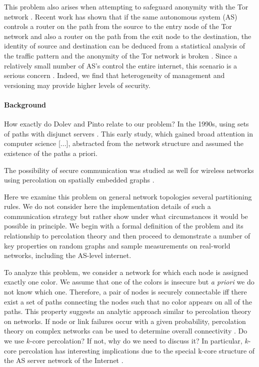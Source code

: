 \documentclass[aps, pre, twocolumn, a4paper, floatfix]{revtex4}
\begin{document}
This problem also arises when attempting to safeguard anonymity with the Tor network \cite{dingledine-proceedings2004}.  
Recent work has shown that if the same autonomous system (AS) controls a router on the path from the source to the entry node of the Tor network and also a router on the path from the exit node to the destination, the identity of source and destination can be deduced from a statistical analysis of the traffic pattern and the anonymity of the Tor network is broken \cite{murdoch-proceedings2007}.
Since a relatively small number of AS's control the entire internet, this scenario is a serious concern \cite{edman-proceedings2009}.
Indeed, we find that heterogeneity of management and versioning may provide higher levels of security.


\paragraph{Background}

{ \color{red} How exactly do Dolev and Pinto relate to our problem? }
In the 1990s, using sets of paths with disjunct servers \cite{dolev-acm1993}.
This early study, which gained broad attention in computer science [...],
abstracted from the network structure and assumed the existence of the paths a priori. 

The possibility of secure communication was studied as
well for wireless networks using percolation on spatially embedded
graphs \cite{pinto-ieee2012}. 


Here we examine this problem on general network topologies several partitioning rules.  
We do not consider here the implementation details of such a communication strategy but rather show under what circumstances it would be possible in principle.
We begin with a formal definition of the problem and its relationship to percolation theory and then proceed to demonstrate a number of key properties on random graphs and sample measurements on real-world networks, including the AS-level internet.

To analyze this problem, we consider a network for which each node is assigned exactly one color.
We assume that one of the colors is insecure but \textit{a priori} we do not know  which one.
Therefore, a pair of nodes is securely connectable iff there exist a set of paths connecting the nodes such that no color appears on all of the paths.  
This property suggests an analytic approach similar to percolation theory on networks.
If node or link failures occur with a given probability, 
percolation theory on complex networks can be used to determine overall connectivity \cite{cohen-book2010,newman-book2010}. 
{\color{red} Do we use $k$-core percolation? If not, why do we need to discuss it?}
In particular, $k$-core percolation \cite{dorogovtsev-prl2006} has interesting implications due to the special k-core structure of the AS server network of the
Internet \cite{tauro-ieee2001,carmi-pnas2007}. 
\end{document}
